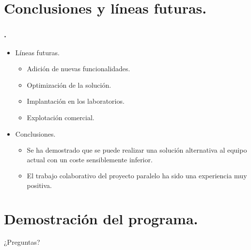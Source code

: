 \documentclass{beamer}
\begin{document}
\section{Conclusiones y líneas futuras.}
\begin{frame}[environment=slide]
\frametitle{\insertsectionnumber.\insertsection}
	\begin{itemize}
		\item Líneas futuras.
		\begin{itemize}
				\item Adición de nuevas funcionalidades.
				\pause
				\item Optimización de la solución.
				\pause
				\item Implantación en los laboratorios. 
				\pause
				\item Explotación comercial.
				\pause
		\end{itemize}
		\item Conclusiones.
		\begin{itemize}
				\item Se ha demostrado que se puede realizar una solución alternativa al equipo actual con un coste sensiblemente inferior.
				\item El trabajo colaborativo del proyecto paralelo ha sido una experiencia muy positiva.
		\end{itemize}
	\end{itemize}
\end{frame}

\section{Demostración del programa.}

\begin{frame}
\centering
\Huge{¿Preguntas?}
\end{frame}

\end{document}
